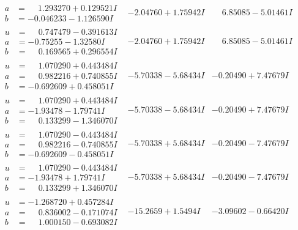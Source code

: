 \documentclass[1p]{elsarticle_modified}
\theoremstyle{definition}
\begin{document}
$$\begin{array}{c|c|c}
\begin{aligned}
a &= \phantom{-}1.293270 + 0.129521 I \\
b &= -0.046233 - 1.126590 I\end{aligned}
 & -2.04760 + 1.75942 I & \phantom{-}6.85085 - 5.01461 I \\ \hline\begin{aligned}
u &= \phantom{-}0.747479 - 0.391613 I \\
a &= -0.75255 - 1.32580 I \\
b &= \phantom{-}0.169565 + 0.296554 I\end{aligned}
 & -2.04760 + 1.75942 I & \phantom{-}6.85085 - 5.01461 I \\ \hline\begin{aligned}
u &= \phantom{-}1.070290 + 0.443484 I \\
a &= \phantom{-}0.982216 + 0.740855 I \\
b &= -0.692609 + 0.458051 I\end{aligned}
 & -5.70338 - 5.68434 I & -0.20490 + 7.47679 I \\ \hline\begin{aligned}
u &= \phantom{-}1.070290 + 0.443484 I \\
a &= -1.93478 - 1.79741 I \\
b &= \phantom{-}0.133299 - 1.346070 I\end{aligned}
 & -5.70338 - 5.68434 I & -0.20490 + 7.47679 I \\ \hline\begin{aligned}
u &= \phantom{-}1.070290 - 0.443484 I \\
a &= \phantom{-}0.982216 - 0.740855 I \\
b &= -0.692609 - 0.458051 I\end{aligned}
 & -5.70338 + 5.68434 I & -0.20490 - 7.47679 I \\ \hline\begin{aligned}
u &= \phantom{-}1.070290 - 0.443484 I \\
a &= -1.93478 + 1.79741 I \\
b &= \phantom{-}0.133299 + 1.346070 I\end{aligned}
 & -5.70338 + 5.68434 I & -0.20490 - 7.47679 I \\ \hline\begin{aligned}
u &= -1.268720 + 0.457284 I \\
a &= \phantom{-}0.836002 - 0.171074 I \\
b &= \phantom{-}1.000150 - 0.693082 I\end{aligned}
 & -15.2659 + 1.5494 I & -3.09602 - 0.66420 I \\ \hline\begin{aligned}

\end{aligned}
\end{array}$$
\end{document}

